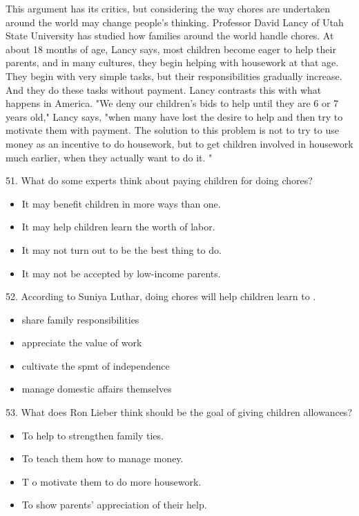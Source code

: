 \documentclass[UTF8,11pt]{ctexart}
\begin{document}
This argument has its critics, but considering the way chores are undertaken around the world may change people's thinking. Professor David Lancy of Utah State University has studied how families around the world handle chores. At about 18 months of age, Lancy says, most children become eager to help their parents, and in many cultures, they begin helping with housework at that age. They begin with very simple tasks, but their responsibilities gradually increase. And they do these tasks without payment. Lancy contrasts this with what happens in America. "We deny our children's bids to help until they are 6 or 7 years old," Lancy says, "when many have lost the desire to help and then try to motivate them with payment. The solution to this problem is not to try to use money as an incentive to do housework, but to get children involved in housework much earlier, when they actually want to do it. "


51. What do some experts think about paying children for doing chores?


\begin{itemize}[leftmargin=2em,itemsep=.2em,topsep=.4em]\item[A.] It may benefit children in more ways than one.
\item[B.] It may help children learn the worth of labor.
\item[C.] It may not turn out to be the best thing to do.
\item[D.] It may not be accepted by low-income parents.
\end{itemize}

52. According to Suniya Luthar, doing chores will help children learn to .


\begin{itemize}[leftmargin=2em,itemsep=.2em,topsep=.4em]\item[A.] share family responsibilities
\item[B.] appreciate the value of work
\item[C.] cultivate the spmt of independence
\item[D.] manage domestic affairs themselves
\end{itemize}

53. What does Ron Lieber think should be the goal of giving children allowances?


\begin{itemize}[leftmargin=2em,itemsep=.2em,topsep=.4em]\item[A.] To help to strengthen family ties.
\item[B.] To teach them how to manage money.
\item[C.] T o motivate them to do more housework.
\item[D.] To show parents' appreciation of their help.
\end{itemize}
\end{document}
